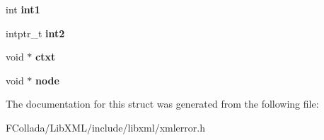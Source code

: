 \begin{DoxyCompactItemize}
\item 
\hypertarget{struct__xmlError_a6f9278bc2b797ad7f6a92b765aead611}{
int {\bfseries int1}}
\label{struct__xmlError_a6f9278bc2b797ad7f6a92b765aead611}

\item 
\hypertarget{struct__xmlError_aec6c071694501d5884fcdfc243ff8f52}{
intptr\_\-t {\bfseries int2}}
\label{struct__xmlError_aec6c071694501d5884fcdfc243ff8f52}

\item 
\hypertarget{struct__xmlError_a7258bcb21de5672a51c7ef270cc0be94}{
void $\ast$ {\bfseries ctxt}}
\label{struct__xmlError_a7258bcb21de5672a51c7ef270cc0be94}

\item 
\hypertarget{struct__xmlError_aa5cec792d70f116cc88d9e57f18829df}{
void $\ast$ {\bfseries node}}
\label{struct__xmlError_aa5cec792d70f116cc88d9e57f18829df}

\end{DoxyCompactItemize}


The documentation for this struct was generated from the following file:\begin{DoxyCompactItemize}
\item 
FCollada/LibXML/include/libxml/xmlerror.h\end{DoxyCompactItemize}
